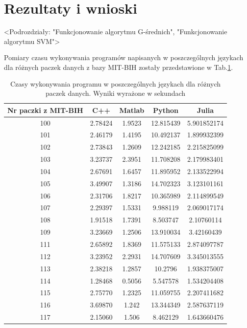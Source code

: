 \section{Rezultaty i wnioski}

<Podrozdziały: "Funkcjonowanie algorytmu G-średnich", "Funkcjonowanie algorytmu SVM">

Pomiary czasu wykonywania programów napisanych w poszczególnych językach dla różnych paczek danych z bazy MIT-BIH zostały przedstawione w Tab.\ref{tabResults}.

\begin{table}[!tp]
	\centering
	\caption{Czasy wykonywania programu w poszczególnych językach dla różnych paczek danych. Wyniki wyrażone w sekundach}
	\label{tabResults}
	\begin{tabular}{|c|c|c|c|c|}
		\hline
		Nr paczki z MIT-BIH & C++ & Matlab & Python & Julia\\ \hline		
		100 & 2.78424 & 1.9523 & 12.815439 & 5.901852174\\ \hline
		101 & 2.46179 & 1.4195 & 10.492137 & 1.899932399\\ \hline
		102 & 2.73843 & 1.2609 & 12.242185 & 2.215825099\\ \hline
		103 & 3.23737 & 2.3951 & 11.708208 & 2.179983401\\ \hline
		104 & 2.67691 & 1.6457 & 11.895952 & 2.133522994\\ \hline
		105 & 3.49907 & 1.3186 & 14.702323 & 3.123101161\\ \hline
		106 & 2.31706 & 1.8217 & 10.365989 & 2.114899549\\ \hline
		107 & 2.29397 & 1.5331 &  9.988119 & 2.069017174\\ \hline
		108 & 1.91518 & 1.7391 &  8.503747 & 2.10760114\\ \hline
		109 & 3.23669 & 1.2506 & 13.910034 & 3.42160439\\ \hline
		111 & 2.65892 & 1.8369 & 11.575133 & 2.874097787\\ \hline
		112 & 3.23952 & 2.2931 & 14.707609 & 3.345013555\\ \hline
		113 & 2.38218 & 1.2857 & 10.2796   & 1.938375007\\ \hline
		114 & 1.28468 & 0.5056 &  5.547578 & 1.534204408\\ \hline
		115 & 2.75770 & 1.2325 & 11.059755 & 2.207411682\\ \hline
		116 & 3.69870 & 1.242  & 13.344349 & 2.587637119\\ \hline
		117 & 2.15060 & 1.506  &  8.462129 & 1.643660476\\ \hline

\end{tabular}
\end{table}
